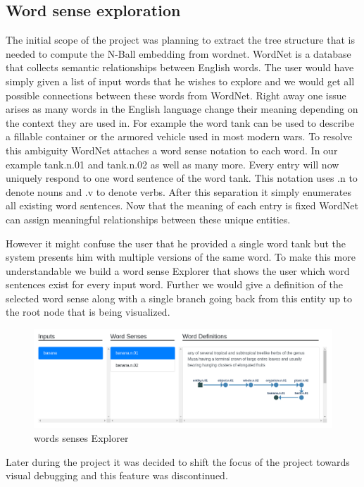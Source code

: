 \subsection{Word sense exploration}
The initial scope of the project was planning to extract the tree structure that is needed to compute the N-Ball embedding from wordnet. WordNet is a database that collects semantic relationships between English words. The user would have simply given a list of input words that he wishes to explore and we would get all possible connections between these words from WordNet. 
Right away one issue arises as many words in the English language change their meaning depending on the context they are used in. For example the word tank can be used to describe a fillable container or the armored vehicle used in most modern wars. To resolve this ambiguity WordNet attaches a word sense notation to each word. In our example tank.n.01 and tank.n.02 as well as many more. Every entry will now uniquely respond to one word sentence of the word tank. This notation uses .n to denote nouns and .v to denote verbs. After this separation it simply enumerates all existing word sentences. Now that the meaning of each entry is fixed WordNet can assign meaningful relationships between these unique entities. 

However it might confuse the user that he provided a single word tank but the system presents him with multiple versions of the same word. To make this more understandable we build a word sense Explorer that shows the user which word sentences exist for every input word. Further we would give a definition of the selected word sense along with a single branch going back from this entity up to the root node that is being visualized.

\begin{figure}[H]
	\includegraphics[width=\textwidth]{res/word-sense.png}
	\caption{words senses Explorer}
	\label{fig:word-sense}
\end{figure}



Later during the project it was decided to shift the focus of the project towards visual debugging and this feature was discontinued.

